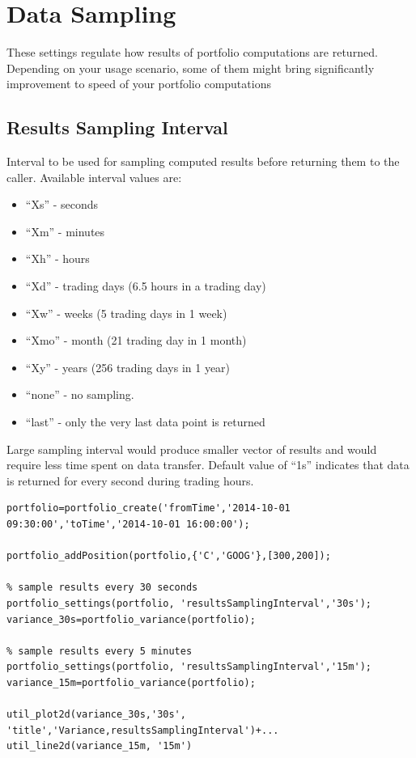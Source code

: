 \documentclass[letterpaper]{report}
\begin{document}
\section{Data Sampling}
These settings regulate how results of portfolio computations are returned. 
Depending on your usage scenario, some of them might bring significantly improvement to speed of your portfolio computations
\subsection{Results Sampling Interval}
Interval to be used for sampling computed results before returning them to the caller. 
Available interval values are: 
\begin{itemize} 
  \item ``Xs'' - seconds
  \item ``Xm'' - minutes
  \item ``Xh'' - hours
  \item ``Xd'' - trading days (6.5 hours in a trading day)
  \item ``Xw'' - weeks (5 trading days in 1 week)
  \item ``Xmo'' - month (21 trading day in 1 month)
  \item ``Xy'' - years (256 trading days in 1 year)
  \item ``none'' - no sampling.
  \item ``last'' - only the very last data point is returned  
\end{itemize}
Large sampling interval would produce smaller vector of results and would require less time spent on data transfer. 
Default value of ``1s'' indicates that data is returned for every second during
trading hours.
\begin{lstlisting}
portfolio=portfolio_create('fromTime','2014-10-01 09:30:00','toTime','2014-10-01 16:00:00');

portfolio_addPosition(portfolio,{'C','GOOG'},[300,200]);

% sample results every 30 seconds
portfolio_settings(portfolio, 'resultsSamplingInterval','30s');
variance_30s=portfolio_variance(portfolio);

% sample results every 5 minutes
portfolio_settings(portfolio, 'resultsSamplingInterval','15m');
variance_15m=portfolio_variance(portfolio);

util_plot2d(variance_30s,'30s', 'title','Variance,resultsSamplingInterval')+...
util_line2d(variance_15m, '15m')
\end{lstlisting}
\end{document}
